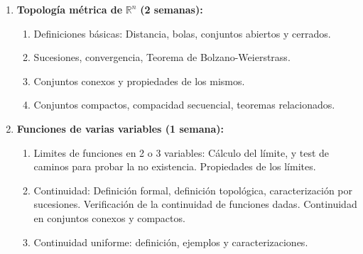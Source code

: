 \begin{refsection}
\begin{enumerate}
\item \textbf{Topología métrica de} $\mathbb{R}^n$ \textbf{(2 semanas):}
\begin{enumerate}
\item Definiciones b\'asicas: Distancia, bolas, conjuntos abiertos y cerrados.
\item Sucesiones, convergencia, Teorema de Bolzano-Weierstrass.
\item Conjuntos conexos y propiedades de los mismos.
\item Conjuntos compactos, compacidad secuencial, teoremas relacionados.
\end{enumerate}

\item \textbf{Funciones de varias variables (1 semana):}
\begin{enumerate}
\item Limites de funciones en 2 o 3 variables: C\'alculo del l\'imite, y test de caminos para probar la no existencia. Propiedades de los límites.
\item Continuidad: Definición formal, definición topológica, caracterización por sucesiones.  Verificación de la continuidad de funciones dadas.  Continuidad en conjuntos conexos y compactos.
\item Continuidad uniforme: definición, ejemplos y caracterizaciones.
\end{enumerate}



\end{enumerate}
\end{refsection}
